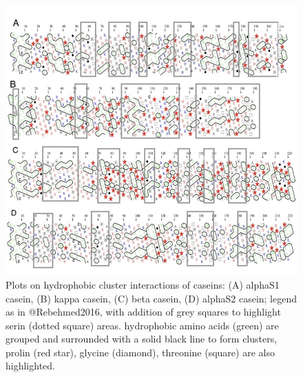 \documentclass[
]{article}
\begin{document}
\begin{figure}
\includegraphics[width=1\linewidth]{images/HCA_serin} \caption[Hydrophobic Cluster Analysis (HCA plot) of caseins]{Plots on hydrophobic cluster interactions of caseins:  (A) alphaS1 casein, (B) kappa casein, (C) beta casein, (D) alphaS2 casein; legend as in @Rebehmed2016, with addition of grey squares to highlight serin (dotted square) areas.  hydrophobic amino acids (green) are grouped and surrounded with a solid black line to form clusters, prolin (red star), glycine (diamond), threonine (square) are also highlighted.}\label{fig:HCA}
\end{figure}
\end{document}

